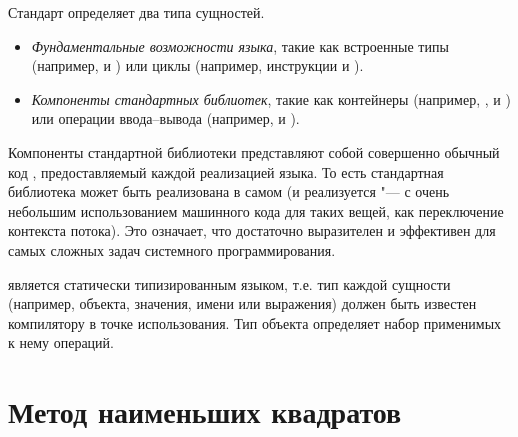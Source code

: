 Стандарт   определяет два типа сущностей.
\begin{itemize}
\item \textit{Фундаментальные возможности языка}, такие как встроенные типы (например,  и ) или циклы (например, инструкции  и ).

\item \textit{Компоненты стандартных библиотек}, такие как контейнеры (например, , и ) или операции ввода--вывода (например, \code{<<} и ).
\end{itemize}

Компоненты стандартной библиотеки представляют собой совершенно обычный код , предоставляемый каждой реализацией языка. То есть стандартная библиотека  может быть реализована в самом  (и реализуется "--- с очень небольшим использованием машинного кода для таких вещей, как переключение контекста потока). Это означает, что  достаточно выразителен и эффективен для самых сложных задач системного программирования.

 является статически типизированным языком, т.е. тип каждой сущности (например, объекта, значения, имени или выражения) должен быть известен компилятору в точке использования. Тип объекта определяет набор применимых к нему операций.



\section{Метод наименьших квадратов}

